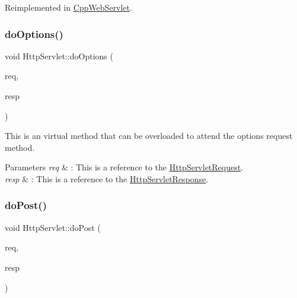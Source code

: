 Reimplemented in \mbox{\hyperlink{class_cpp_web_servlet_a8d32d5ba8ba73c10a7c1abc81497d898}{Cpp\+Web\+Servlet}}.

\mbox{\label{class_http_servlet_a1abc608f8ac9b682a59f2231775330c6}} 
\subsubsection{\texorpdfstring{do\+Options()}{doOptions()}}
{\footnotesize\ttfamily void Http\+Servlet\+::do\+Options (\begin{DoxyParamCaption}\item[{\mbox{\hyperlink{class_http_servlet_request}{Http\+Servlet\+Request}} \&}]{req,  }\item[{\mbox{\hyperlink{class_http_servlet_response}{Http\+Servlet\+Response}} \&}]{resp }\end{DoxyParamCaption})\hspace{0.3cm}{\ttfamily [virtual]}}



This is an virtual method that can be overloaded to attend the options request method. 


\begin{DoxyParams}{Parameters}
{\em req} & \+: This is a reference to the \mbox{\hyperlink{class_http_servlet_request}{Http\+Servlet\+Request}}. \\
\hline
{\em resp} & \+: This is a reference to the \mbox{\hyperlink{class_http_servlet_response}{Http\+Servlet\+Response}}. \\
\hline
\end{DoxyParams}
\mbox{\label{class_http_servlet_a6b94fb3bb052b2138ee673feb65e37c9}} 
\subsubsection{\texorpdfstring{do\+Post()}{doPost()}}
{\footnotesize\ttfamily void Http\+Servlet\+::do\+Post (\begin{DoxyParamCaption}\item[{\mbox{\hyperlink{class_http_servlet_request}{Http\+Servlet\+Request}} \&}]{req,  }\item[{\mbox{\hyperlink{class_http_servlet_response}{Http\+Servlet\+Response}} \&}]{resp }\end{DoxyParamCaption})\hspace{0.3cm}{\ttfamily [virtual]}}



